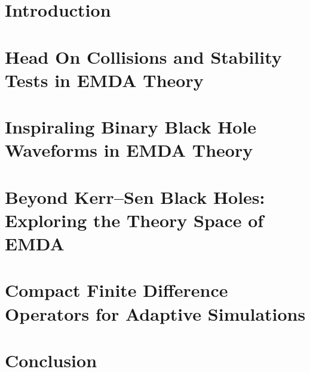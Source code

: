 \documentclass[etd,oneside,phd]{BYUPhys}
\begin{document}
 \frontmatter

 \makepreliminarypages

 \tableofcontents
\cleardoublepage
\listoffigures

\cleardoublepage
\listoftables
 \mainmatter

\chapter{Introduction}


\chapter{Head On Collisions and Stability Tests in EMDA Theory}


\chapter{Inspiraling Binary Black Hole Waveforms in EMDA Theory}


\chapter{Beyond Kerr--Sen Black Holes: Exploring the Theory Space of EMDA}


\chapter{Compact Finite Difference Operators for Adaptive Simulations}


\chapter{Conclusion}

\end{document}
